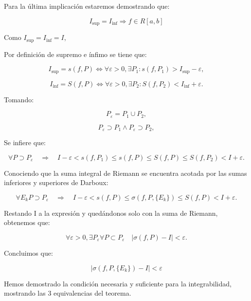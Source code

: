 \documentclass[a4paper,12pt]{article}
\begin{document}
	
	Para la última implicación estaremos demostrando que:
	
	\[
	I_{\text{sup}} = I_{\text{inf}} \Rightarrow f \in R[a,b]
	\]
	
	Como \( I_{\text{sup}} = I_{\text{inf}} = I \), 
	
	Por definición de supremo e ínfimo se tiene que:
	
	\[
	I_{\text{sup}} = s(f,P) \Longleftrightarrow \forall \varepsilon > 0, \exists P_1 : s(f, P_1) > I_{\text{sup}} - \varepsilon,
	\]
	
	\[
	I_{\text{inf}} = S(f,P) \Longleftrightarrow \forall \varepsilon > 0, \exists P_2 : S(f, P_2) < I_{\text{inf}} + \varepsilon.
	\]
	
	
	
	Tomando:
	
	
	
	\[
	P_\varepsilon = P_1 \cup P_2,
	\]
	
	
	
	
	
	\[
	P_\varepsilon \supset P_1 \land P_\varepsilon \supset P_2,
	\]
	
	
	
	Se infiere que:
	
	
	
	\[
	\forall P \supset P_\varepsilon \quad \Rightarrow \quad I - \varepsilon < s(f, P_1) \leq s(f, P) \leq S(f,P) \leq S(f, P_2) < I + \varepsilon.
	\]
	
	
	
	Conociendo que la suma integral de Riemann se encuentra acotada por las sumas inferiores y superiores de Darboux:
	
	
	
	\[
	\forall {E_k} P \supset P_\varepsilon \quad \Rightarrow \quad I - \varepsilon < s(f, P) \leq \sigma(f, P, \{E_k\}) \leq S(f,P) < I + \varepsilon.
	\]
	
	
	
	Restando I a la expresión y quedándonos solo con la suma de Riemann, obtenemos que:
	
	
	
	\[
	\forall \varepsilon > 0, \exists P_\varepsilon \forall P \subset P_\varepsilon \quad \big| \sigma(f,P) - I \big| < \varepsilon.
	\]
	
	Concluimos que:
	
	\[
	\left| \sigma(f, P, \{E_k\}) - I \right| < \varepsilon
	\]
	
	
	
	Hemos demostrado la condición necesaria y suficiente para la integrabilidad, mostrando las 3 equivalencias del teorema.
	
\end{document}
